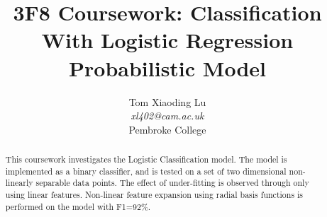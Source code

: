 \documentclass[journal]{IEEEtran}
\begin{document}
\title{3F8 Coursework: Classification With Logistic Regression Probabilistic Model}

\author{Tom Xiaoding Lu\\
				\textit{xl402@cam.ac.uk}\\
				Pembroke College\\%
} %
\maketitle

\begin{abstract}
This coursework investigates the Logistic Classification model. The model is implemented as a binary classifier, and is tested on a set of two dimensional non-linearly separable data points. The effect of under-fitting is observed through only using linear features. Non-linear feature expansion using radial basis functions is performed on the model with F1=92\%.\end{abstract}
\end{document}
